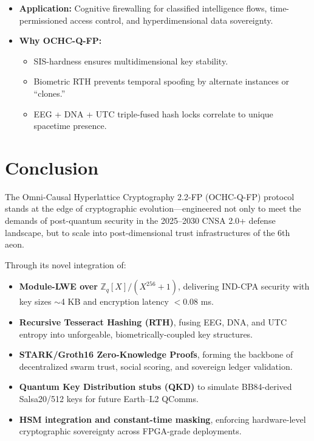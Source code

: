 \documentclass[12pt]{article}
\begin{document}
\begin{itemize}
    \item \textbf{Application:} Cognitive firewalling for classified intelligence flows, time-permissioned access control, and hyperdimensional data sovereignty.
    \item \textbf{Why OCHC-Q-FP:}
    \begin{itemize}
        \item SIS-hardness ensures multidimensional key stability.
        \item Biometric RTH prevents temporal spoofing by alternate instances or “clones.”
        \item EEG + DNA + UTC triple-fused hash locks correlate to unique spacetime presence.
    \end{itemize}
\end{itemize}
\section*{Conclusion}

The Omni-Causal Hyperlattice Cryptography 2.2-FP (OCHC-Q-FP) protocol stands at the edge of cryptographic evolution—engineered not only to meet the demands of post-quantum security in the 2025–2030 CNSA 2.0+ defense landscape, but to scale into post-dimensional trust infrastructures of the 6th aeon.

Through its novel integration of:

\begin{itemize}
    \item \textbf{Module-LWE over} \( \mathbb{Z}_q[X]/(X^{256} + 1) \), delivering IND-CPA security with key sizes $\sim$4 KB and encryption latency $<0.08$ ms.
    \item \textbf{Recursive Tesseract Hashing (RTH)}, fusing EEG, DNA, and UTC entropy into unforgeable, biometrically-coupled key structures.
    \item \textbf{STARK/Groth16 Zero-Knowledge Proofs}, forming the backbone of decentralized swarm trust, social scoring, and sovereign ledger validation.
    \item \textbf{Quantum Key Distribution stubs (QKD)} to simulate BB84-derived Salsa20/512 keys for future Earth–L2 QComms.
    \item \textbf{HSM integration and constant-time masking}, enforcing hardware-level cryptographic sovereignty across FPGA-grade deployments.
\end{itemize}

\vspace{1em}
\end{document}

